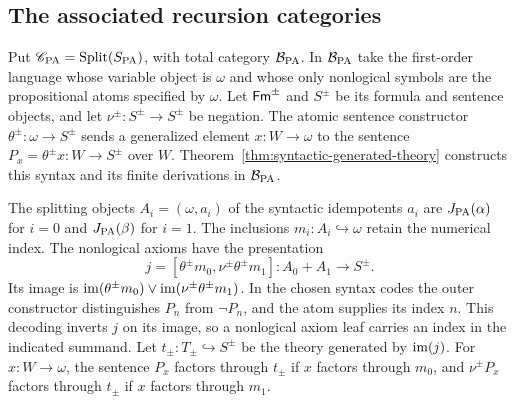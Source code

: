 \subsection{The associated recursion categories}
\label{subsec:arithmetic-associated-categories}

Put $\mathscr C_{\mathrm{PA}}=\operatorname{Split}(S_{\mathrm{PA}})$, with total category
$\mathcal B_{\mathrm{PA}}$. In $\mathcal B_{\mathrm{PA}}$ take the first-order language
whose variable object is $\omega$ and whose only nonlogical symbols
are the propositional atoms specified by $\omega$.
Let $\mathsf{Fm}^{\pm}$ and $S^{\pm}$ be its formula and sentence objects, and
let $\nu^{\pm}:S^{\pm}\to S^{\pm}$ be negation. The atomic sentence
constructor $\theta^{\pm}:\omega\to S^{\pm}$ sends a generalized element
$x:W\to\omega$ to the sentence $P_x=\theta^{\pm}x:W\to S^{\pm}$
over $W$. Theorem~\ref{thm:syntactic-generated-theory} constructs
this syntax and its finite derivations in
$\mathcal B_{\mathrm{PA}}$.

The splitting objects $A_i=(\omega,a_i)$ of the syntactic idempotents
$a_i$ are $J_{\mathrm{PA}}(\alpha)$ for $i=0$ and $J_{\mathrm{PA}}(\beta)$ for $i=1$.
The inclusions $m_i:A_i\hookrightarrow\omega$ retain the numerical index.
The nonlogical axioms have the presentation
\[
 j=[\theta^{\pm}m_0,\nu^{\pm}\theta^{\pm}m_1]:
 A_0+A_1\longrightarrow S^{\pm}.
\]
Its image is $\operatorname{im}(\theta^{\pm}m_0)\vee\operatorname{im}(\nu^{\pm}\theta^{\pm}m_1)$.
In the chosen syntax codes the outer constructor distinguishes
$P_n$ from $\neg P_n$, and the atom supplies its index $n$.
This decoding inverts $j$ on its image, so a nonlogical axiom
leaf carries an index in the indicated summand.
Let $t_{\pm}:T_{\pm}\hookrightarrow S^{\pm}$ be the theory
generated by $\operatorname{im}(j)$.
For $x:W\to\omega$, the sentence $P_x$ factors through $t_{\pm}$
if $x$ factors through $m_0$, and $\nu^{\pm}P_x$ factors through
$t_{\pm}$ if $x$ factors through $m_1$.

